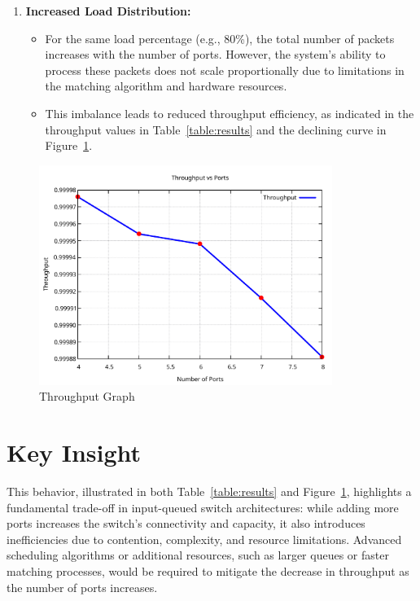 \documentclass[12pt	]{article}
\begin{document}
\begin{enumerate}
	\item \textbf{Increased Load Distribution:}
	\begin{itemize}
		\item For the same load percentage (e.g., 80\%), the total number of packets increases with the number of ports. However, the system's ability to process these packets does not scale proportionally due to limitations in the matching algorithm and hardware resources.
		\item This imbalance leads to reduced throughput efficiency, as indicated in the throughput values in {Table~\ref{table:results}} and the declining curve in {Figure~\ref{fig:Throughput Graph}}.
	\end{itemize}
\end{enumerate}

\begin{figure}[h!]
	\centering
	\includegraphics[width=0.85\textwidth]{Images/result.pdf}
	\caption{Throughput Graph}
	\label{fig:Throughput Graph}
\end{figure}

\section{Key Insight}

This behavior, illustrated in both {Table~\ref{table:results}} and {Figure~\ref{fig:Throughput Graph}}, highlights a fundamental trade-off in input-queued switch architectures: while adding more ports increases the switch's connectivity and capacity, it also introduces inefficiencies due to contention, complexity, and resource limitations. Advanced scheduling algorithms or additional resources, such as larger queues or faster matching processes, would be required to mitigate the decrease in throughput as the number of ports increases.
\end{document}
